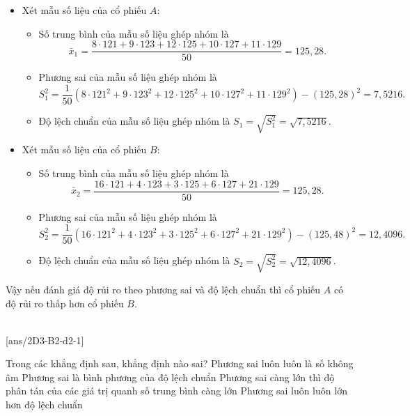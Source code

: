 \begin{vd}
{\begin{center}
\begin{tabular}{|c|c|c|c|c|c|}
				\hline
			\end{tabular}
		\end{center}
		\begin{itemize}
			\item Xét mẫu số liệu của cổ phiếu $A$:
			      \begin{itemize}
				      \item Số trung bình của mẫu số liệu ghép nhóm là
				            $$
					            \bar{x}_1=\dfrac{8 \cdot 121+9\cdot 123+12 \cdot 125+10\cdot 127+11\cdot 129}{50}=125,28.
				            $$
				      \item Phương sai của mẫu số liệu ghép nhóm là
				            $$
					            S_1^2=\dfrac{1}{50}\left(8 \cdot 121^2+9 \cdot 123^2+12 \cdot 125^2+10 \cdot 127^2+11 \cdot 129^2\right)-(125,28)^2=7,5216.
				            $$
				      \item Độ lệch chuẩn của mẫu số liệu ghép nhóm là $S_1=\sqrt{S_1^2}=\sqrt{7,5216}$.
			      \end{itemize}
			\item Xét mẫu số liệu của cổ phiếu $B$:
			      \begin{itemize}
				      \item Số trung bình của mẫu số liệu ghép nhóm là
				            $$
					            \bar{x}_2=\dfrac{16\cdot 121+4\cdot 123+3\cdot 125+6\cdot 127+21\cdot 129}{50}=125,28.
				            $$
				      \item Phương sai của mẫu số liệu ghép nhóm là
				            $$
					            S_2^2=\dfrac{1}{50}\left(16\cdot 121^2+4\cdot 123^2+3 \cdot 125^2+6 \cdot 127^2+21\cdot 129^2\right)-(125,48)^2=12,4096.$$
				      \item Độ lệch chuẩn của mẫu số liệu ghép nhóm là $S_2=\sqrt{S_2^2}=\sqrt{12,4096}$.
			      \end{itemize}
		\end{itemize}
		Vậy nếu đánh giá độ rủi ro theo phương sai và độ lệch chuẩn thì cổ phiếu $A$ có độ rủi ro thấp hơn cổ phiếu $B$.
	}
\end{vd}

 \\
\setcounter{ex}{0}
[ans/2D3-B2-d2-1]
\begin{ex}
	Trong các khẳng định sau, khẳng định nào sai?
	\choice
	{Phương sai luôn luôn là số không âm}
	{Phương sai là bình phương của độ lệch chuẩn}
	{Phương sai càng lớn thì độ phân tán của các giá trị quanh số trung bình càng lớn}
	{\True Phương sai luôn luôn lớn hơn độ lệch chuẩn}
\end{ex}

